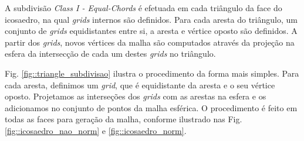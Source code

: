 \documentclass[
    12pt,                %
    oneside,            %
    a4paper,            %
    english,            %
    french,                %
    spanish,            %
    brazil                %
    ]{abntex2}
\begin{document}
A subdivisão \textit{Class I - Equal-Chords} é efetuada em cada triângulo da face do icosaedro, na qual \textit{grids} internos são definidos. Para cada aresta do triângulo, um conjunto de \textit{grids} equidistantes entre si, a aresta e vértice oposto são definidos. A partir dos \textit{grids}, novos vértices da malha são computados através da projeção na esfera da intersecção de cada um destes \textit{grids} no triângulo. 

Fig. \ref{fig::triangle_subdivisao} ilustra o procedimento da forma mais simples. Para cada aresta, definimos um \textit{grid}, que é equidistante da aresta e o seu vértice oposto. Projetamos as interseções dos \textit{grids} com as arestas na esfera e os adicionamos no conjunto de pontos da malha esférica. O procedimento é feito em todas as faces para geração da malha, conforme ilustrado nas Fig.\ref{fig::icosaedro_nao_norm} e \ref{fig::icosaedro_norm}.
\end{document}

